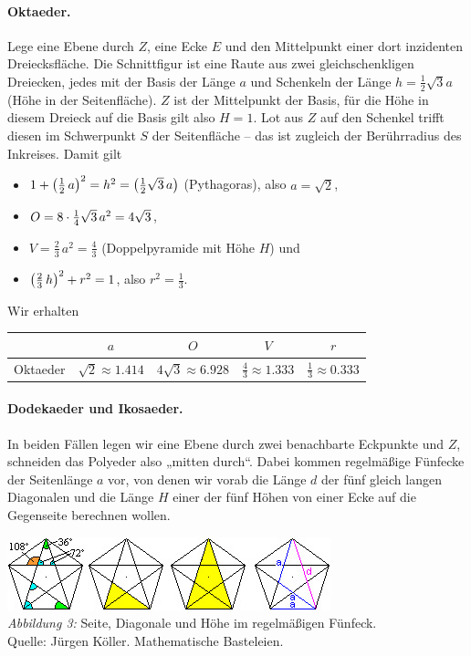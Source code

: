 \documentclass[11pt]{article}
\begin{document}
\paragraph{Oktaeder.}
Lege eine Ebene durch $Z$, eine Ecke $E$ und den Mittelpunkt einer dort
inzidenten Dreiecksfläche. Die Schnittfigur ist eine Raute aus zwei
gleichschenkligen Dreiecken, jedes mit der Basis der Länge $a$ und Schenkeln
der Länge $h=\frac12\sqrt{3}a$ (Höhe in der Seitenfläche). $Z$ ist der
Mittelpunkt der Basis, für die Höhe in diesem Dreieck auf die Basis gilt also
$H=1$.  Lot aus $Z$ auf den Schenkel trifft diesen im Schwerpunkt $S$ der
Seitenfläche -- das ist zugleich der Berührradius des Inkreises. Damit gilt
\begin{itemize}
\item $1+\left(\frac12\,a\right)^2=h^2=\left(\frac12\sqrt{3}\,a\right)$ (Pythagoras), also
  $a=\sqrt{2}$, 
\item $O=8\cdot\frac14\sqrt{3}\,a^2=4\sqrt{3}$, 
\item $V=\frac23\,a^2=\frac43$ (Doppelpyramide mit Höhe $H$) und 
\item $\left(\frac23\,h\right)^2+r^2=1$, also $r^2=\frac13$.
\end{itemize}
Wir erhalten 
\begin{center}
  \begin{tabular}{|l|c|c|c|c|}\hline
    & $a$ & $O$ & $V$ & $r$ \\\hline
    Oktaeder & $\sqrt{2}\approx 1.414$ & $4\sqrt{3}\approx 6.928$ &
    $\frac43 \approx 1.333$ & $\frac13 \approx 0.333$ \\\hline
  \end{tabular}
\end{center}

\paragraph{Dodekaeder und Ikosaeder.}
In beiden Fällen legen wir eine Ebene durch zwei benachbarte Eckpunkte und
$Z$, schneiden das Polyeder also „mitten durch“.  Dabei kommen regelmäßige
Fünfecke der Seitenlänge $a$ vor, von denen wir vorab die Länge $d$ der fünf
gleich langen Diagonalen und die Länge $H$ einer der fünf Höhen von einer Ecke
auf die Gegenseite berechnen wollen.

\begin{center}
  \includegraphics[width=.8\textwidth]{graebe-05-1/fuenfeck.jpg}\\
  \emph{Abbildung 3:} Seite, Diagonale und Höhe im regelmäßigen Fünfeck.\\
  Quelle: Jürgen Köller. Mathematische Basteleien. \cite{KoellerFuenfeck}
\end{center}
\end{document}
